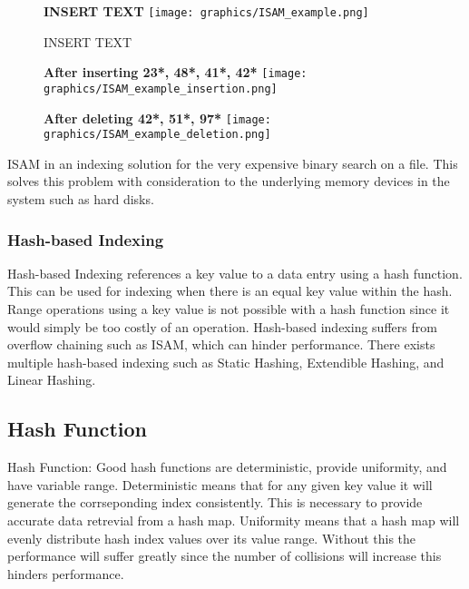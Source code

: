 \documentclass[letterpaper, 12pt]{article}
\begin{document}
\begin{figure}
  \centering
  \textbf{INSERT TEXT}
  \texttt{[image: graphics/ISAM\_example.png]}
  \caption{INSERT TEXT}
\end{figure}

\begin{figure}
  \centering
  \textbf{After inserting 23*, 48*, 41*, 42*}
  \texttt{[image: graphics/ISAM\_example\_insertion.png]}
\end{figure}

\begin{figure}
  \centering
  \textbf{After deleting 42*, 51*, 97*}
  \texttt{[image: graphics/ISAM\_example\_deletion.png]}
\end{figure}

\par\vspace{\baselineskip}

ISAM in an indexing solution for the very expensive binary search on a file. This solves this
problem with consideration to the underlying memory devices in the system such as hard disks.

\subsubsection{Hash-based Indexing}
Hash-based Indexing references a key value to a data entry using a hash function. This can be
used for indexing when there is an equal key value within the hash. Range operations using
a key value is not possible with a hash function since it would simply be too costly of an
operation. Hash-based indexing suffers from overflow chaining such as ISAM, which can hinder
performance. There exists multiple hash-based indexing such as Static Hashing, Extendible Hashing,
and Linear Hashing.
\subsection{Hash Function}
Hash Function:
Good hash functions are deterministic, provide uniformity, and have variable range. Deterministic means
that for any given key value it will generate the corrseponding index consistently. This is
necessary to provide accurate data retrevial from a hash map. Uniformity means that a hash
map will evenly distribute hash index values over its value range. Without this the
performance will suffer greatly since the number of collisions will increase this hinders performance.
\end{document}
